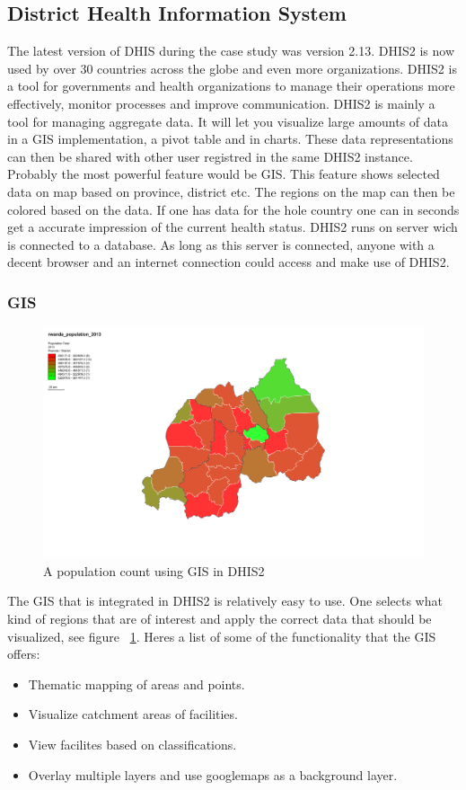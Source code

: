 \subsection{District Health Information System}
\label{sec:dhis}
The latest version of DHIS during the case study was version 2.13.
DHIS2 is now used by over 30 countries across the globe and even more organizations.
DHIS2 is a tool for governments and health organizations to manage their operations more effectively, monitor processes and improve communication.
DHIS2 is mainly a tool for managing aggregate data. 
It will let you visualize large amounts of data in a GIS implementation, a pivot table and in charts. 
These data representations can then be shared with other user registred in the same DHIS2 instance.
Probably the most powerful feature would be GIS. 
This feature shows selected data on map based on province, district etc. 
The regions on the map can then be colored based on the data. 
If one has data for the hole country one can in seconds get a accurate impression of the current health status. 
DHIS2 runs on server wich is connected to a database. 
As long as this server is connected, anyone with a decent browser and an internet connection could access and make use of DHIS2.
\subsubsection{GIS}
\begin{figure}
\centering
\includegraphics[width=12cm]{empirical/images/map_rwanda_population_2013}
\caption{A population count using GIS in DHIS2}
\label{fig:a_population_count_using_gis_in_dhis2}
\end{figure}
The GIS that is integrated in DHIS2 is relatively easy to use. 
One selects what kind of regions that are of interest and apply the correct data that should be visualized, see figure ~\ref{fig:a_population_count_using_gis_in_dhis2}.
Heres a list of some of the functionality that the GIS offers:
\begin{itemize}
\item Thematic mapping of areas and points.
\item Visualize catchment areas of facilities.
\item View facilites based on classifications.
\item Overlay multiple layers and use googlemaps as a background layer.
\end{itemize}\cite{10}
